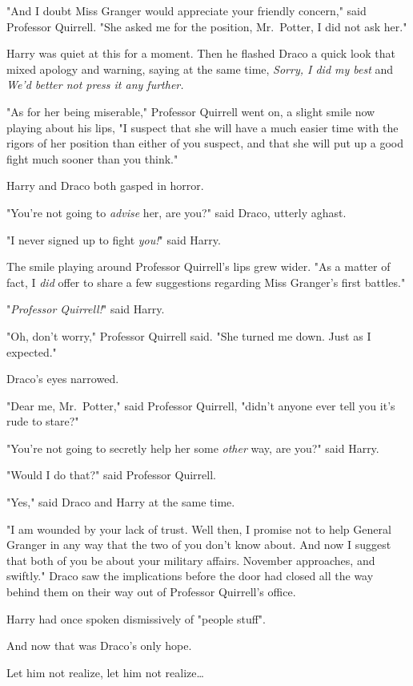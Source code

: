 "And I doubt Miss Granger would appreciate your friendly concern," said
Professor Quirrell. "She asked me for the position, Mr.~Potter, I did not ask
her."

Harry was quiet at this for a moment. Then he flashed Draco a quick look that
mixed apology and warning, saying at the same time, \emph{Sorry, I did my best}
and \emph{We'd better not press it any further.}

"As for her being miserable," Professor Quirrell went on, a slight smile now
playing about his lips, "I suspect that she will have a much easier time with
the rigors of her position than either of you suspect, and that she will put up
a good fight much sooner than you think."

Harry and Draco both gasped in horror.

"You're not going to \emph{advise} her, are you?" said Draco, utterly aghast.

"I never signed up to fight \emph{you!}" said Harry.

The smile playing around Professor Quirrell's lips grew wider. "As a matter of
fact, I \emph{did} offer to share a few suggestions regarding Miss Granger's
first battles."

"\emph{Professor Quirrell!}" said Harry.

"Oh, don't worry," Professor Quirrell said. "She turned me down. Just as I
expected."

Draco's eyes narrowed.

"Dear me, Mr.~Potter," said Professor Quirrell, "didn't anyone ever tell you
it's rude to stare?"

"You're not going to secretly help her some \emph{other} way, are you?" said
Harry.

"Would I do that?" said Professor Quirrell.

"Yes," said Draco and Harry at the same time.

"I am wounded by your lack of trust. Well then, I promise not to help General
Granger in any way that the two of you don't know about. And now I suggest that
both of you be about your military affairs. November approaches, and swiftly."
\later
Draco saw the implications before the door had closed all the way behind them
on their way out of Professor Quirrell's office.

Harry had once spoken dismissively of "people stuff".

And now that was Draco's only hope.

Let him not realize, let him not realize{\ldots}

